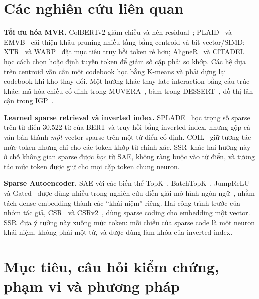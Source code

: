 \documentclass[a4paper,13pt]{extreport}
\theoremstyle{plain}
\newcommand{\ssr}{SSR}
\begin{document}
\section{Các nghiên cứu liên quan}
\textbf{Tối ưu hóa MVR.} ColBERTv2 giảm chiều và nén residual~\cite{santhanam2022b}; PLAID~\cite{santhanam2022a} và EMVB~\cite{nardini2024} cải thiện khâu pruning nhiều tầng bằng centroid và bit-vector/SIMD; XTR~\cite{lee2023} và WARP~\cite{scheerer2025} đặt mục tiêu truy hồi token rẻ hơn; AligneR~\cite{qian2022} và CITADEL~\cite{li2023a} học cách chọn hoặc định tuyến token để giảm số cặp phải so khớp. Các hệ dựa trên centroid vẫn cần một codebook học bằng K-means và phải dựng lại codebook khi kho thay đổi. Một hướng khác thay late interaction bằng cấu trúc khác: mã hóa chiều cố định trong MUVERA~\cite{dhulipala2024}, băm trong DESSERT~\cite{engels2023}, đồ thị lân cận trong IGP~\cite{bian2025}.

\textbf{Learned sparse retrieval và inverted index.} SPLADE~\cite{formal2021b,formal2021a,lassance2024} học trọng số sparse trên từ điển 30.522 từ của BERT và truy hồi bằng inverted index, nhưng gộp cả văn bản thành \emph{một} vector sparse trên một từ điển cố định. COIL~\cite{gao2021} giữ tương tác mức token nhưng chỉ cho các token khớp từ chính xác. \ssr\ khác hai hướng này ở chỗ không gian sparse được \emph{học} từ SAE, không ràng buộc vào từ điển, và tương tác mức token được giữ cho mọi cặp token chung neuron.

\textbf{Sparse Autoencoder.} SAE với các biến thể TopK~\cite{gao2024}, BatchTopK~\cite{bussmann2024}, JumpReLU~\cite{rajamanoharan2024b} và Gated~\cite{rajamanoharan2024a} được dùng nhiều trong nghiên cứu diễn giải mô hình ngôn ngữ~\cite{cunningham2023,templeton2024}, nhằm tách dense embedding thành các ``khái niệm'' riêng. Hai công trình trước của nhóm tác giả, CSR~\cite{wen2025} và CSRv2~\cite{guo2026}, dùng sparse coding cho embedding một vector. \ssr\ đưa ý tưởng này xuống mức token: mỗi chiều của sparse code là một neuron khái niệm, không phải một từ, và được dùng làm khóa của inverted index.

\section{Mục tiêu, câu hỏi kiểm chứng, phạm vi và phương pháp}
\label{sec:goal}
\end{document}
